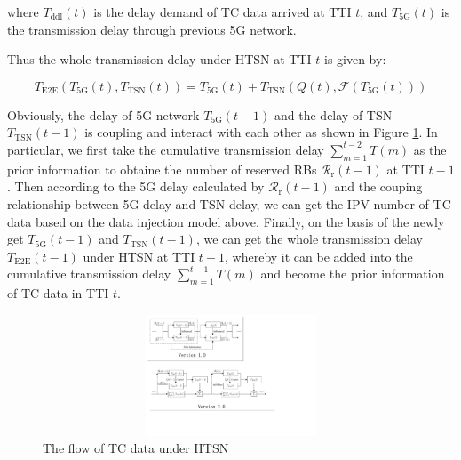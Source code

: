 \documentclass{SCIS2021}
\begin{document}
	\vspace{-6pt}
	\noindent where $T_\text{ddl}(t)$ is the delay demand of TC data arrived at TTI $t$, and $T_\text{5G}(t)$ is the transmission delay through previous 5G network.
	
	
	
	\par Thus the whole transmission delay under HTSN at TTI $t$ is given by:
	
	\setlength\abovedisplayskip{-16pt}
	\begin{center}
		\begin{equation}
			T_\text{E2E}\left(T_\text{5G}(t), T_\text{TSN}(t)\right)=T_\text{5G}(t)+T_\text{TSN}\left(Q(t), \mathcal{F}\left(T_\text{5G}(t)\right)\right)
		\end{equation}
	\end{center}
	\setlength\belowdisplayskip{-8pt}
	
	\vspace{-6pt}
	\par {\color{blue}Obviously, the delay of 5G network $T_\text{5G}(t-1)$ and the delay of TSN $T_\text{TSN}(t-1)$ is coupling and interact with each other as shown in Figure \ref{fig:flow}. In particular, we first take the cumulative transmission delay $\sum_{m=1}^{t-2} T(m)$ as the prior information to obtaine the number of reserved RBs $\mathcal{R}_{\mathrm{r}}(t-1)$ at TTI $t-1$. Then according to the 5G delay calculated by $\mathcal{R}_{\mathrm{r}}(t-1)$ and the couping relationship between 5G delay and TSN delay, we can get the IPV number of TC data based on the data injection model above. Finally, on the basis of the newly get $T_\text{5G}(t-1)$ and $T_\text{TSN}(t-1)$, we can get the whole transmission delay $T_\text{E2E}(t-1)$ under HTSN at TTI $t-1$, whereby it can be added into the cumulative transmission delay $\sum_{m=1}^{t-1} T(m)$ and become the prior information of TC data in TTI $t$.}
	
	\begin{figure}[h] 
		\centering 
		\includegraphics[height=3.6cm, width=15.5cm]{flow} 
		\caption{The flow of TC data under HTSN} 
		\label{fig:flow}
	\end{figure}
	
\end{document}
